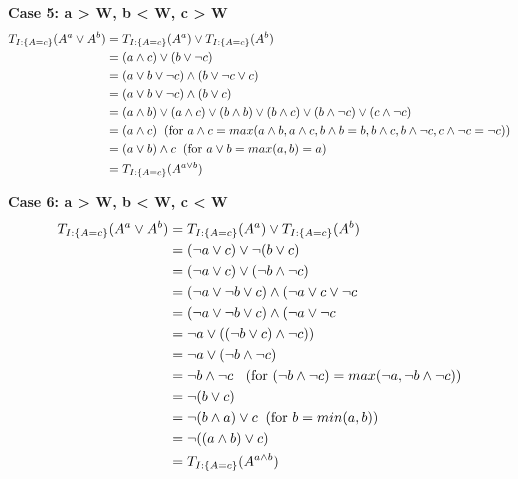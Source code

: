 \documentclass[part1.tex]{subfiles}
\begin{document}
{\bfseries Case 5: a > W, b < W, c > W}
\begin{align*}
        T_{I:\{A = c\}}(A^{a} \vee A^{b}) 
                 &= T_{I:\{A = c\}}(A^{a}) \vee T_{I:\{A = c\}}(A^{b}) \\
                 &= (a \wedge c) \vee (b \vee \neg{c}) \\
                 &= (a \vee b \vee \neg{c}) \wedge (b \vee \neg{c} \vee c)\\
                 &= (a \vee b \vee \neg{c}) \wedge (b \vee c)\\
                 &= (a \wedge b) \vee (a \wedge c) \vee (b \wedge
                        b) \vee (b \wedge c) \vee (b \wedge \neg{c}) \vee (c \wedge
                        \neg{c})\\            
                 &= (a \wedge c) \text{\: (for $a \wedge c = max(a \wedge
                        b, a \wedge c, b \wedge
                        b = b, b \wedge c, b \wedge \neg{c}, c \wedge
                        \neg{c} = \neg{c})$)}\\        
                 &= (a \vee b) \wedge c \text{\: (for $a
                        \vee b = max(a,b) = a$)} \\
                 &= T_{I:\{A = c\}}(A^{a \vee b}) \\
\end{align*}

{\bfseries Case 6: a > W, b < W, c < W}
\begin{align*}
        T_{I:\{A = c\}}(A^{a} \vee A^{b}) 
                 &= T_{I:\{A = c\}}(A^{a}) \vee T_{I:\{A = c\}}(A^{b}) \\
                 &= (\neg{a} \vee c) \vee \neg{(b \vee c)} \\
                 &=  (\neg{a} \vee c) \vee (\neg{b} \wedge \neg{c})\\
                 &= (\neg{a} \vee \neg{b} \vee c) \wedge (\neg{a} \vee c \vee \neg{c}\\
                 &= (\neg{a} \vee \neg{b} \vee c) \wedge (\neg{a} \vee \neg{c}\\
                 &= \neg{a} \vee ((\neg{b} \vee c) \wedge \neg{c}))\\
                 &= \neg{a} \vee (\neg{b} \wedge \neg{c})\\
                 &= \neg{b} \wedge \neg{c} \text{
        \: (for $(\neg{b} \wedge \neg{c}) = max(\neg{a}, \neg{b} \wedge \neg{c})$)}\\
                 &= \neg{(b \vee c)}\\
                 &= \neg{(b \wedge a) \vee c} \text{\: (for $b = min(a,b)$)}\\
                 &= \neg{((a \wedge b) \vee c)}\\
                 &= T_{I:\{A = c\}}(A^{a \wedge b}) \\
\end{align*}
\end{document}
